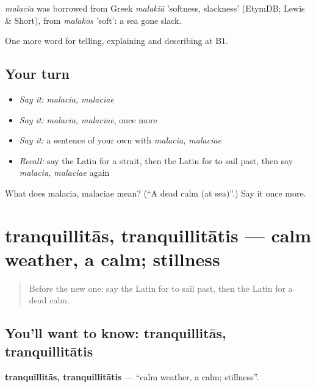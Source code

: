 \begin{cousinweb}
\emph{malacia} was borrowed from Greek \emph{malakiā} 'softness, slackness' (EtymDB; Lewis \& Short), from \emph{malakos} 'soft': a sea gone slack.
\end{cousinweb}

\begin{grammarlens}[title={What you've built}]
One more word for telling, explaining and describing at B1.
\end{grammarlens}

\subsection*{Your turn}
\begin{itemize}
\raggedright
  \item \emph{Say it:} \emph{malacia, malaciae}
  \item \emph{Say it:} \emph{malacia, malaciae}, once more
  \item \emph{Say it:} a sentence of your own with \emph{malacia, malaciae}
  \item \emph{Recall:} say the Latin for a strait, then the Latin for to sail past, then say \emph{malacia, malaciae} again
\end{itemize}

\begin{tcolorbox}[breakable,colback=teal!4,colframe=teal!35!black,title={Before you move on}]
What does malacia, malaciae mean? (\textquotedblleft{}A dead calm (at sea)\textquotedblright{}.) Say it once more.
\end{tcolorbox}
\section[tranquillitās, tranquillitātis]{tranquillitās, tranquillitātis — calm weather, a calm; stillness}

\label{lesson:LA-C444-tranquillitas}



\begin{quote}
Before the new one: say the Latin for to sail past, then the Latin for a dead calm.
\end{quote}

\subsection*{You'll want to know: tranquillitās, tranquillitātis}
\textbf{tranquillitās, tranquillitātis} — \textquotedblleft{}calm weather, a calm; stillness\textquotedblright{}.

